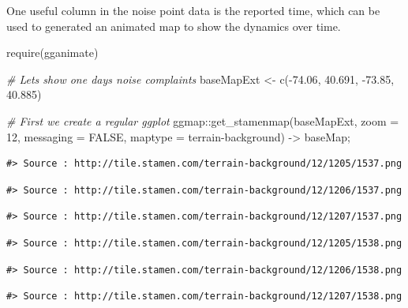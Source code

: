 \documentclass[
  11pt,
]{book}
\newenvironment{Shaded}{\begin{snugshade}}{\end{snugshade}}
\newcommand{\AttributeTok}[1]{\textcolor[rgb]{0.77,0.63,0.00}{#1}}
\newcommand{\CommentTok}[1]{\textcolor[rgb]{0.56,0.35,0.01}{\textit{#1}}}
\newcommand{\ConstantTok}[1]{\textcolor[rgb]{0.00,0.00,0.00}{#1}}
\newcommand{\DecValTok}[1]{\textcolor[rgb]{0.00,0.00,0.81}{#1}}
\newcommand{\FloatTok}[1]{\textcolor[rgb]{0.00,0.00,0.81}{#1}}
\newcommand{\FunctionTok}[1]{\textcolor[rgb]{0.00,0.00,0.00}{#1}}
\newcommand{\NormalTok}[1]{#1}
\newcommand{\OtherTok}[1]{\textcolor[rgb]{0.56,0.35,0.01}{#1}}
\newcommand{\SpecialCharTok}[1]{\textcolor[rgb]{0.00,0.00,0.00}{#1}}
\newcommand{\StringTok}[1]{\textcolor[rgb]{0.31,0.60,0.02}{#1}}
\begin{document}
One useful column in the noise point data is the reported time, which can be used to generated an animated map to show the dynamics over time.

\begin{Shaded}
\begin{Highlighting}[]
\FunctionTok{require}\NormalTok{(gganimate)}

\CommentTok{\# Let\textquotesingle{}s show one day\textquotesingle{}s noise complaints}
\NormalTok{baseMapExt }\OtherTok{\textless{}{-}} \FunctionTok{c}\NormalTok{(}\SpecialCharTok{{-}}\FloatTok{74.06}\NormalTok{, }\FloatTok{40.691}\NormalTok{, }\SpecialCharTok{{-}}\FloatTok{73.85}\NormalTok{, }\FloatTok{40.885}\NormalTok{)}

\CommentTok{\# First we create a regular ggplot}
\NormalTok{ggmap}\SpecialCharTok{::}\FunctionTok{get\_stamenmap}\NormalTok{(baseMapExt, }\AttributeTok{zoom =} \DecValTok{12}\NormalTok{, }\AttributeTok{messaging =} \ConstantTok{FALSE}\NormalTok{, }\AttributeTok{maptype =} \StringTok{\textquotesingle{}terrain{-}background\textquotesingle{}}\NormalTok{) }\OtherTok{{-}\textgreater{}}\NormalTok{ baseMap;}
\end{Highlighting}
\end{Shaded}

\begin{verbatim}
#> Source : http://tile.stamen.com/terrain-background/12/1205/1537.png
\end{verbatim}

\begin{verbatim}
#> Source : http://tile.stamen.com/terrain-background/12/1206/1537.png
\end{verbatim}

\begin{verbatim}
#> Source : http://tile.stamen.com/terrain-background/12/1207/1537.png
\end{verbatim}

\begin{verbatim}
#> Source : http://tile.stamen.com/terrain-background/12/1205/1538.png
\end{verbatim}

\begin{verbatim}
#> Source : http://tile.stamen.com/terrain-background/12/1206/1538.png
\end{verbatim}

\begin{verbatim}
#> Source : http://tile.stamen.com/terrain-background/12/1207/1538.png
\end{verbatim}
\end{document}
